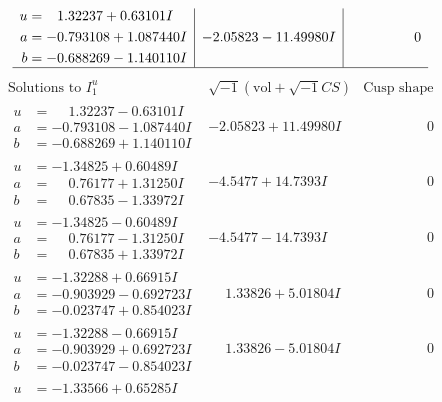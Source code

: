 \documentclass[1p]{elsarticle_modified}
\theoremstyle{definition}
\newcommand{\I}{\sqrt{-1}}
\begin{document}
$$\begin{array}{c|c|c}
\begin{aligned}
u &= \phantom{-}1.32237 + 0.63101 I \\
a &= -0.793108 + 1.087440 I \\
b &= -0.688269 - 1.140110 I\end{aligned}
 & -2.05823 - 11.49980 I & \phantom{-0.000000 } 0\\
 \hline 
 \end{array}$$\newpage$$\begin{array}{c|c|c}  
\text{Solutions to }I^u_{1}& \I (\text{vol} + \sqrt{-1}CS) & \text{Cusp shape}\\
 \hline 
\begin{aligned}
u &= \phantom{-}1.32237 - 0.63101 I \\
a &= -0.793108 - 1.087440 I \\
b &= -0.688269 + 1.140110 I\end{aligned}
 & -2.05823 + 11.49980 I & \phantom{-0.000000 } 0 \\ \hline\begin{aligned}
u &= -1.34825 + 0.60489 I \\
a &= \phantom{-}0.76177 + 1.31250 I \\
b &= \phantom{-}0.67835 - 1.33972 I\end{aligned}
 & -4.5477 + 14.7393 I & \phantom{-0.000000 } 0 \\ \hline\begin{aligned}
u &= -1.34825 - 0.60489 I \\
a &= \phantom{-}0.76177 - 1.31250 I \\
b &= \phantom{-}0.67835 + 1.33972 I\end{aligned}
 & -4.5477 - 14.7393 I & \phantom{-0.000000 } 0 \\ \hline\begin{aligned}
u &= -1.32288 + 0.66915 I \\
a &= -0.903929 - 0.692723 I \\
b &= -0.023747 + 0.854023 I\end{aligned}
 & \phantom{-}1.33826 + 5.01804 I & \phantom{-0.000000 } 0 \\ \hline\begin{aligned}
u &= -1.32288 - 0.66915 I \\
a &= -0.903929 + 0.692723 I \\
b &= -0.023747 - 0.854023 I\end{aligned}
 & \phantom{-}1.33826 - 5.01804 I & \phantom{-0.000000 } 0 \\ \hline\begin{aligned}
u &= -1.33566 + 0.65285 I \\

\end{aligned}
\end{array}$$
\end{document}
